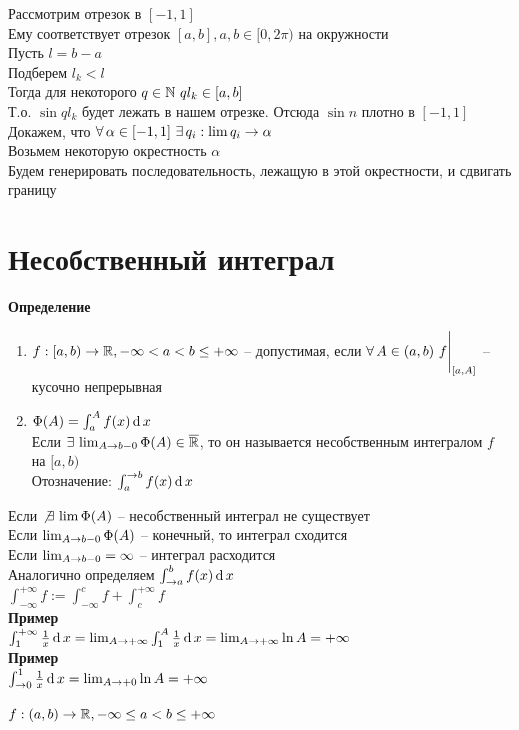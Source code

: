 \documentclass[12pt]{article}
\begin{document}
Рассмотрим отрезок в $[-1, 1]$\\
Ему соответствует отрезок $[a,b], a,b \in [0,2\pi)$ на окружности\\
Пусть $l = b-a$\\
Подберем $l_k < l$\\
Тогда для некоторого $q \in \mathbb{N}\ ql_k\in [a,b]$\\
Т.о. $\sin ql_k$ будет лежать в нашем отрезке. Отсюда $\sin n$ плотно в $[-1, 1]$\\
Докажем, что $\forall\, \alpha\in [-1, 1]\ \exists\, q_i: \lim q_i \rightarrow \alpha$\\
Возьмем некоторую окрестность $\alpha$\\
Будем генерировать последовательность, лежащую в этой окрестности, и сдвигать границу
\section{Несобственный интеграл}
\textbf{Определение}
\begin{enumerate}
    \item $f: [a, b) \rightarrow \mathbb{R}, -\infty < a < b \leq +\infty$ -- допустимая, если $\forall\, A \in (a, b)\ f\Biggr|_{[a,A]}$ -- кусочно непрерывная
    \item $\Phi(A) = \int_a^A f(x)\operatorname{d} x$\\
    Если $\exists\, \lim_{A \rightarrow b-0} \Phi(A) \in \overline{\mathbb{R}}$, то он называется несобственным интегралом $f$ на $[a,b)$\\
    Отозначение: $\int_a^{\rightarrow b} f(x)\operatorname{d} x$
\end{enumerate}
Если $\not\exists\, \lim \Phi(A)$ -- несобственный интеграл не существует\\
Если $\lim_{A \rightarrow b-0} \Phi(A)$ -- конечный, то интеграл сходится\\
Если $\lim_{A \rightarrow b-0} = \infty$ -- интеграл расходится\\
Аналогично определяем $\int_{\rightarrow a}^b f(x)\operatorname{d} x$\\
$\int_{-\infty}^{+\infty} f := \int_{-\infty}^c f + \int_c^{+\infty} f$\\
\textbf{Пример}\\
$\int_1^{+\infty} \frac1x \operatorname{d} x = \lim_{A \rightarrow +\infty} \int_1^A \frac1x\operatorname{d} x = \lim_{A \rightarrow +\infty} \ln A = +\infty$\\
\textbf{Пример}\\
$\int_{\rightarrow 0}^1 \frac1x \operatorname{d} x = \lim_{A\rightarrow +0} \ln A = +\infty$\\\\
$f: (a,b) \rightarrow \mathbb{R}, -\infty \leq a < b \leq +\infty$\\
\end{document}
